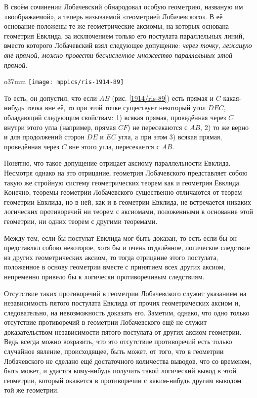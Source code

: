В своём сочинении Лобачевский обнародовал особую геометрию, названую им «воображаемой», а теперь называемой «геометрией Лобачевского».
В её основание положены те же геометрические аксиомы, на которых основана
геометрия Евклида, за исключением только его постулата параллельных линий, вместо которого Лобачевский взял следующее допущение:
\emph{через точку, лежащую вне прямой, можно провести бесчисленное множество параллельных этой прямой}.

\begin{wrapfigure}{o}{37mm}
\centering
\texttt{[image: mppics/ris-1914-89]}
\caption{}\label{1914/ris-89}
\end{wrapfigure}

То есть, он допустил, что если $AB$ (рис. \ref{1914/ris-89}) есть прямая и $C$ какая-нибудь точка вне её, то при этой точке существует некоторый угол $DEC$, обладающий следующим свойствам:
1) всякая прямая, проведённая через $C$ внутри этого угла (например, прямая $CF$) не пересекаются с $AB$,
2) то же верно и для продолжений сторон $DE$ и $EC$ угла,
а при этом 3) всякая прямая, проведённая через $C$ вне этого угла, пересекается с $AB$.

Понятно, что такое допущение отрицает аксиому параллельности Евклида.
Несмотря однако на это отрицание, геометрия Лобачевского представляет собою такую же стройную
систему геометрических теорем как и геометрия Евклида.
Конечно, теоремы геометрии Лобачевского существенно отличаются от теорем геометрии Евклида, но
в ней, как и в геометрии Евклида, не встречается никаких логических противоречий ни теорем с аксиомами, положенными в основание этой геометрии, ни одних теорем с другими теоремами.

Между тем, если бы постулат Евклида мог быть доказан, то есть если бы он представлял собою
некоторое, хотя бы и очень отдалённое, логическое следствие из других геометрических аксиом, то тогда отрицание этого постулата, положенное в основу геометрии вместе с принятием всех других аксиом, непременно привело бы к логически противоречивым следствиям.

Отсутствие таких противоречий в геометрии Лобачевского служит указанием на независимость пятого
постулата Евклида от прочих геометрических аксиом и, следовательно, на невозможность доказать его.
Заметим, однако, что одно только отсутствие противоречий в геометрии Лобачевского ещё не служит доказательством независимости пятого постулата от других аксиом геометрии.
Ведь всегда можно возразить, что это отсутствие противоречий есть только
случайное явление, происходящее, быть может, от того, что в геометрии Лобачевского не сделано ещё достаточного количества выводов, что со временем, быть может, и удастся кому-нибудь получить
такой логический вывод в этой геометрии, который окажется в противоречии с каким-нибудь другим выводом той же геометрии.

